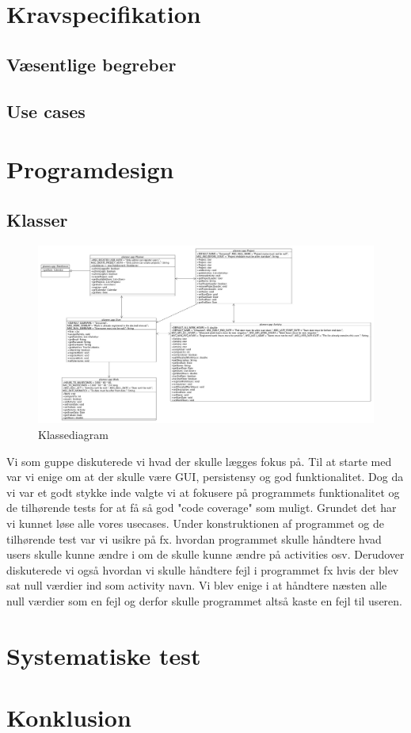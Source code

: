 \documentclass[a4paper,12pt]{article}
\begin{document}
\section{Kravspecifikation}
\subsection{Væsentlige begreber}
\subsection{Use cases}
\newpage
\section{Programdesign}
\subsection{Klasser}
\begin{figure}[h]
\centering
\includegraphics[scale=0.25]{classdiagram.jpg}
\caption{Klassediagram}
\label{fig: Klassediagram}
\end{figure}
 
Vi som guppe diskuterede vi hvad der skulle lægges fokus på. Til at starte med var vi enige om at der skulle være GUI, persistensy og god funktionalitet. Dog da vi var et godt stykke inde valgte vi at fokusere på programmets funktionalitet og de tilhørende tests for at få så god "code coverage" som muligt. Grundet det har vi kunnet løse alle vores usecases.
Under konstruktionen af programmet og de tilhørende test var vi usikre på fx. hvordan programmet skulle håndtere hvad users skulle kunne ændre i om de skulle kunne ændre på activities osv. Derudover diskuterede vi også hvordan vi skulle håndtere fejl i programmet fx hvis der blev sat null værdier ind som activity navn. Vi blev enige i at håndtere næsten alle null værdier som en fejl og derfor skulle programmet altså kaste en fejl til useren.

\section{Systematiske test}
\section{Konklusion}
\end{document}
